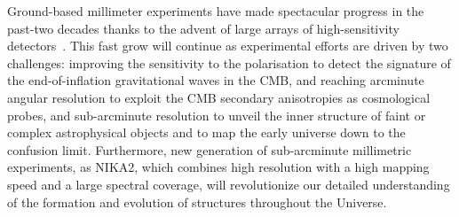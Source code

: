 Ground-based millimeter experiments have made spectacular progress in
the past-two decades thanks to the advent of large arrays of
high-sensitivity detectors~\citep{Wilson2008_AZTEC,
  Siringo2009_LABOCA, Swetz2011_ACT, Bleem2012_SPT, Monfardini2011_NIKA, Holland2013_SCUBA2,
  Dicker2014_MUSTANG2, Adam2017}. %
This fast grow will continue as experimental efforts are
driven by two challenges: improving the sensitivity to the
polarisation to detect the signature of
the end-of-inflation gravitational waves in the CMB, and reaching
arcminute angular resolution to exploit the CMB secondary anisotropies
as cosmological probes, and sub-arcminute resolution to unveil the
inner structure of faint or complex astrophysical objects and to map
the early universe down to the confusion limit. Furthermore, new
generation of sub-arcminute millimetric experiments, as NIKA2, which
combines high resolution with a high mapping speed and a large spectral
coverage, will revolutionize our detailed understanding of the
formation and evolution of structures throughout the Universe.
%
%

